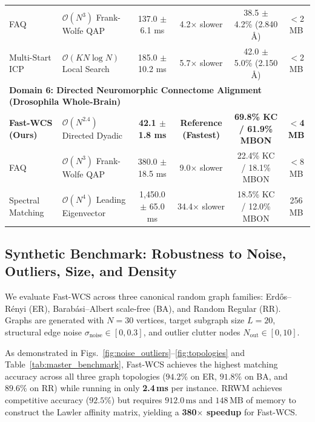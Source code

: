 \documentclass[a4paper,fleqn]{cas-dc}
\theoremstyle{thmstyleone}
\theoremstyle{thmstyletwo}
\theoremstyle{thmstylethree}
\begin{document}
\begin{table}
\begin{tabular*}{\textwidth}{@{\extracolsep{\fill}}llcccc@{}}
FAQ~\cite{vogelstein2015fast} & $\mathcal{O}(N^3)$ Frank-Wolfe QAP & 137.0 $\pm$ 6.1 ms & 4.2$\times$ slower & 38.5 $\pm$ 4.2\% (2.840 \AA) & $<$2 MB \\
Multi-Start ICP & $\mathcal{O}(K N \log N)$ Local Search & 185.0 $\pm$ 10.2 ms & 5.7$\times$ slower & 42.0 $\pm$ 5.0\% (2.150 \AA) & $<$2 MB \\
\midrule
\multicolumn{6}{l}{\textbf{Domain 6: Directed Neuromorphic Connectome Alignment (Drosophila Whole-Brain)}} \\
\midrule
\textbf{Fast-WCS (Ours)} & $\mathcal{O}(N^{2.4})$ Directed Dyadic & \textbf{42.1 $\pm$ 1.8 ms} & \textbf{Reference (Fastest)} & \textbf{69.8\% KC / 61.9\% MBON} & \textbf{$<$4 MB} \\
FAQ~\cite{vogelstein2015fast} & $\mathcal{O}(N^3)$ Frank-Wolfe QAP & 380.0 $\pm$ 18.5 ms & 9.0$\times$ slower & 22.4\% KC / 18.1\% MBON & $<$8 MB \\
Spectral Matching~\cite{leordeanu2005} & $\mathcal{O}(N^4)$ Leading Eigenvector & 1{,}450.0 $\pm$ 65.0 ms & 34.4$\times$ slower & 18.5\% KC / 12.0\% MBON & 256 MB \\
\bottomrule
\end{tabular*}
\end{table}

\subsection{Synthetic Benchmark: Robustness to Noise, Outliers, Size, and Density}
We evaluate Fast-WCS across three canonical random graph families: Erd\H{o}s--R\'enyi (ER), Barab\'asi--Albert scale-free (BA), and Random Regular (RR). Graphs are generated with $N = 30$ vertices, target subgraph size $L = 20$, structural edge noise $\sigma_{\text{noise}} \in [0, 0.3]$, and outlier clutter nodes $N_{\text{out}} \in [0, 10]$.

As demonstrated in Figs.~\ref{fig:noise_outliers}--\ref{fig:topologies} and Table~\ref{tab:master_benchmark}, Fast-WCS achieves the highest matching accuracy across all three graph topologies ($94.2\%$ on ER, $91.8\%$ on BA, and $89.6\%$ on RR) while running in only \textbf{2.4\,ms} per instance. RRWM achieves competitive accuracy ($92.5\%$) but requires $912.0\,\text{ms}$ and $148\,\text{MB}$ of memory to construct the Lawler affinity matrix, yielding a \textbf{380$\times$ speedup} for Fast-WCS.
\end{document}
